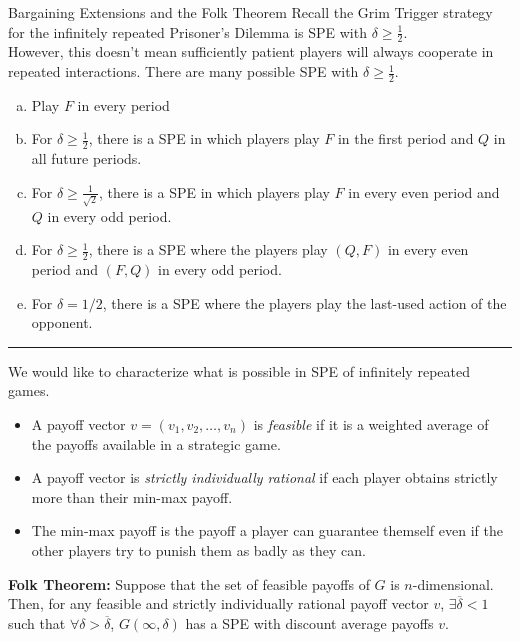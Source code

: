 \documentclass[10pt]{extarticle}
\begin{document}
  \begin{problem}{Bargaining Extensions and the Folk Theorem}
    Recall the Grim Trigger strategy for the infinitely repeated Prisoner's Dilemma is SPE with $\delta \geq \frac{1}{2}$.\\

    However, this doesn't mean sufficiently patient players will always cooperate in repeated interactions. There are many possible SPE with $\delta \geq \frac{1}{2}$.
    \begin{enumerate}[(a)]
      \item Play $F$ in every period
      \item For $\delta \geq \frac{1}{2}$, there is a SPE in which players play $F$ in the first period and $Q$ in all future periods.
      \item For $\delta \geq \frac{1}{\sqrt{2}}$, there is a SPE in which players play $F$ in every even period and $Q$ in every odd period.
      \item For $\delta \geq \frac{1}{2}$, there is a SPE where the players play $(Q,F)$ in every even period and $(F,Q)$ in every odd period.
      \item For $\delta = 1/2$, there is a SPE where the players play the last-used action of the opponent.
    \end{enumerate}
    \vspace{4pt}
    \rule{\textwidth}{0.4pt}
    \vspace{4pt}
    We would like to characterize what is possible in SPE of infinitely repeated games.
    \begin{itemize}
      \item A payoff vector $v = (v_1,v_2,\dots,v_n)$ is \textit{feasible} if it is a weighted average of the payoffs available in a strategic game.
      \item A payoff vector is \textit{strictly individually rational} if each player obtains strictly more than their min-max payoff.
      \item The min-max payoff is the payoff a player can guarantee themself even if the other players try to punish them as badly as they can.
    \end{itemize}
    \textbf{Folk Theorem:} Suppose that the set of feasible payoffs of $G$ is $n$-dimensional. Then, for any feasible and strictly individually rational payoff vector $v$, $\exists \overline{\delta} < 1$ such that $\forall \delta > \overline{\delta}$, $G(\infty,\delta)$ has a SPE with discount average payoffs $v$.
  \end{problem}
\end{document}
